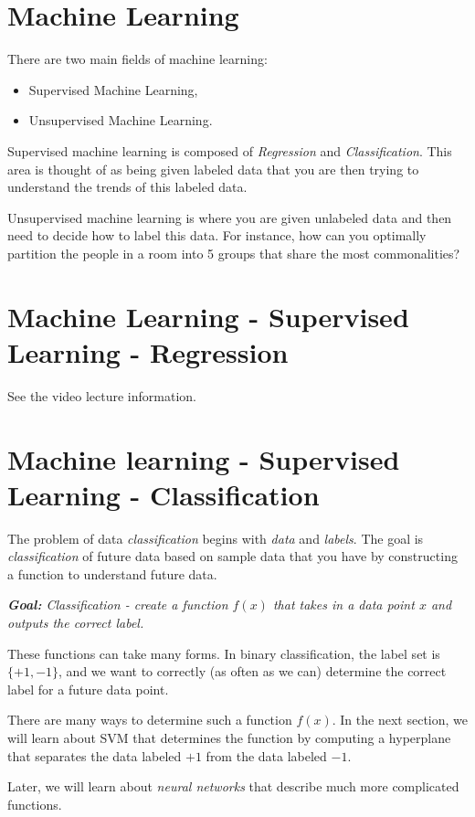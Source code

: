 \section{Machine Learning}
There are two main fields of machine learning:
\begin{itemize}
\item Supervised Machine Learning,
\item Unsupervised Machine Learning.
\end{itemize}
Supervised machine learning is composed of \emph{Regression} and \emph{Classification}.  This area is thought of as being given labeled data that you are then trying to understand the trends of this labeled data.

Unsupervised machine learning is where you are given unlabeled data and then need to decide how to label this data. For instance, how can you optimally partition the people in a room into 5 groups that share the most commonalities?

\section{Machine Learning - Supervised Learning - Regression}
See the video lecture information.


\section{Machine learning - Supervised Learning - Classification}
The problem of data \emph{classification} begins with \emph{data} and \emph{labels}.  The goal is \emph{classification} of future data based on sample data that you have by constructing a function to understand future data.
\begin{center}
\textit{
\textbf{Goal:} Classification - create a function $f(x)$ that takes in a data point $x$ and outputs the correct label.}
\end{center}

These functions can take many forms.  In binary classification, the label set is $\{+1, -1\}$, and we want to correctly (as often as we can) determine the correct label for a future data point.

There are many ways to determine such a function $f(x)$.  In the next section, we will learn about SVM that determines the function by computing a hyperplane that separates the data labeled $+1$ from the data labeled $-1$.

Later, we will learn about \emph{neural networks} that describe much more complicated functions.  

